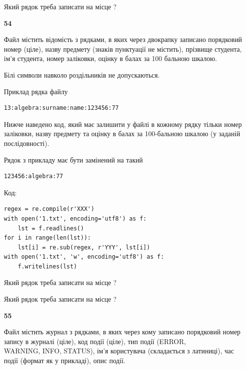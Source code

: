 Який рядок треба записати на місце  ?\par


\newpage

{\begin {center}\textbf{ 54}\end {center}}\par
Файл  містить відомість з рядками, в яких через двокрапку записа\-но поряд\-ковий номер (ціле), назву предмету (знаків пунктуації не містить), прізвище студента, ім'я студента, номер заліковки, оцінку в балах за 100 бальною шкалою.

Білі символи навколо роздільників не допускаються.

Приклад рядка файлу



\begin{verbatim}
13:algebra:surname:name:123456:77
\end{verbatim}


Нижче наведено код, який має залишити у файлі в кожному рядку тільки номер заліковки, назву предмету та оцінку в балах за 100-бальною шкалою (у заданій послі\-дов\-ності).

Рядок з прикладу має бути замінений на такий



\begin{verbatim}
123456:algebra:77
\end{verbatim}




Код:



\begin{verbatim}
regex = re.compile(r'XXX')
with open('1.txt', encoding='utf8') as f:
    lst = f.readlines()
for i in range(len(lst)):
    lst[i] = re.sub(regex, r'YYY', lst[i])
with open('1.txt', 'w', encoding='utf8') as f:
    f.writelines(lst)
\end{verbatim}







Який рядок треба записати на місце  ?\par
\vspace{5mm}


Який рядок треба записати на місце  ?\par


\newpage

{\begin {center}\textbf{ 55}\end {center}}\par
Файл  містить журнал з рядками, в яких через кому записано поряд\-ко\-вий номер запису в журналі (ціле), код події (ціле), тип події (ERROR,\\ WARNING, INFO, STATUS), ім'я користувача (складається з латиниці), час події (фор\-мат як у прикладі), опис події.

